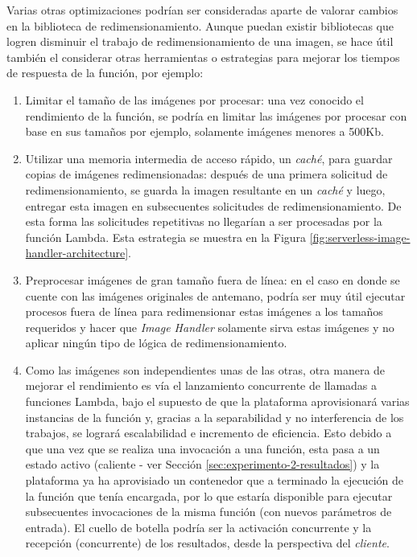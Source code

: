Varias otras optimizaciones podrían ser consideradas aparte de valorar cambios en la biblioteca de redimensionamiento. Aunque puedan existir bibliotecas que logren disminuir el trabajo de redimensionamiento de una imagen, se hace útil también el considerar otras herramientas o estrategias para mejorar los tiempos de respuesta de la función, por ejemplo:
\begin{enumerate}
    \item Limitar el tamaño de las imágenes por procesar: una vez conocido el rendimiento de la función, se podría en limitar las imágenes por procesar con base en sus tamaños por ejemplo, solamente imágenes menores a 500Kb.
    \item Utilizar una memoria intermedia de acceso rápido, un \emph{caché}, para guardar copias de imágenes redimensionadas: después de una primera solicitud de redimensionamiento, se guarda la imagen resultante en un \emph{caché} y luego, entregar esta imagen en subsecuentes solicitudes de redimensionamiento. De esta forma las solicitudes repetitivas no llegarían a ser procesadas por la función Lambda. Esta estrategia se muestra en la Figura \ref{fig:serverless-image-handler-architecture}.
    \item Preprocesar imágenes de gran tamaño fuera de línea: en el caso en donde se cuente con las imágenes originales de antemano, podría ser muy útil ejecutar procesos fuera de línea para redimensionar estas imágenes a los tamaños requeridos y hacer que \emph{Image Handler} solamente sirva estas imágenes y no aplicar ningún tipo de lógica de redimensionamiento.
    \item Como las imágenes son independientes unas de las otras, otra manera de mejorar el rendimiento es vía el lanzamiento concurrente de llamadas a funciones Lambda, bajo el supuesto de que la plataforma aprovisionará varias instancias de la función y, gracias a la separabilidad y no interferencia de los trabajos, se logrará escalabilidad e incremento de eficiencia.  Esto debido a que una vez que se realiza una invocación a una función, esta pasa a un estado activo (caliente - ver Sección \ref{sec:experimento-2-resultados}) y la plataforma ya ha aprovisiado un contenedor que a terminado la ejecución de la función que tenía encargada, por lo que estaría disponible para ejecutar subsecuentes invocaciones de la misma función (con nuevos parámetros de entrada). El cuello de botella podría ser la activación concurrente y la recepción (concurrente) de los resultados, desde la perspectiva del \emph{cliente}.   
    
\end{enumerate}


